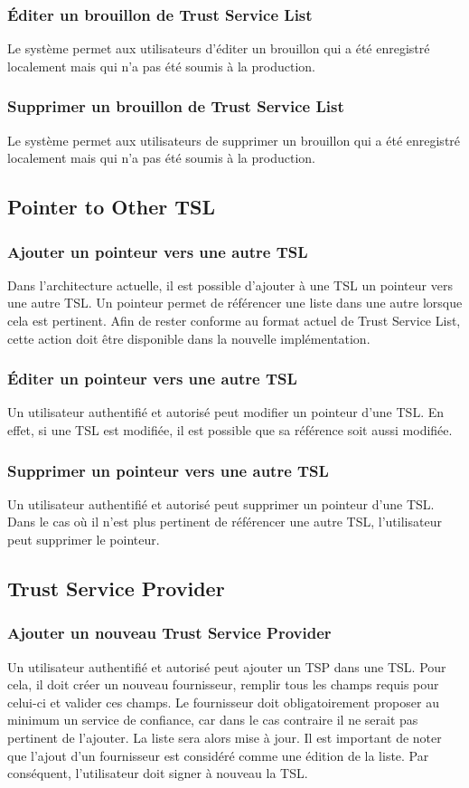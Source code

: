 \documentclass{tnreport}
\begin{document}
\subsubsection{Éditer un brouillon de Trust Service List}
Le système permet aux utilisateurs d'éditer un brouillon qui a été enregistré localement mais qui n'a pas été soumis à la production.
\subsubsection{Supprimer un brouillon de Trust Service List}
Le système permet aux utilisateurs de supprimer un brouillon qui a été enregistré localement mais qui n'a pas été soumis à la production.

\subsection{Pointer to Other TSL}
\subsubsection{Ajouter un pointeur vers une autre TSL}
Dans l'architecture actuelle, il est possible d'ajouter à une TSL un pointeur vers une autre TSL. Un pointeur permet de référencer une liste dans une autre lorsque cela est pertinent. Afin de rester conforme au format actuel de Trust Service List, cette action doit être disponible dans la nouvelle implémentation.
\subsubsection{Éditer un pointeur vers une autre TSL}
Un utilisateur authentifié et autorisé peut modifier un pointeur d'une TSL. En effet, si une TSL est modifiée, il est possible que sa référence soit aussi modifiée.
\subsubsection{Supprimer un pointeur vers une autre TSL}
Un utilisateur authentifié et autorisé peut supprimer un pointeur d'une TSL. Dans le cas où il n'est plus pertinent de référencer une autre TSL, l'utilisateur peut supprimer le pointeur.

\subsection{Trust Service Provider}
\subsubsection{Ajouter un nouveau Trust Service Provider}
Un utilisateur authentifié et autorisé peut ajouter un TSP dans une TSL. Pour cela, il doit créer un nouveau fournisseur, remplir tous les champs requis pour celui-ci et valider ces champs. Le fournisseur doit obligatoirement proposer au minimum un service de confiance, car dans le cas contraire il ne serait pas pertinent de l'ajouter. La liste sera alors mise à jour. Il est important de noter que l'ajout d'un fournisseur est considéré comme une édition de la liste. Par conséquent, l'utilisateur doit signer à nouveau la TSL.
\end{document}
